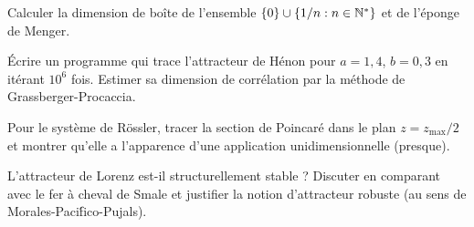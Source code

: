 \begin{exercice}
Calculer la dimension de bo\^ite de l'ensemble $\{0\} \cup \{1/n : n \in \mathbb{N}^*\}$
et de l'\'eponge de Menger.
\end{exercice}

\begin{exercice}
\'Ecrire un programme qui trace l'attracteur de H\'enon pour $a = 1{,}4$,
$b = 0{,}3$ en it\'erant $10^6$ fois. Estimer sa dimension de corr\'elation
par la m\'ethode de Grassberger-Procaccia.
\end{exercice}

\begin{exercice}
Pour le syst\`eme de R\"ossler, tracer la section de Poincar\'e dans le plan
$z = z_{\max}/2$ et montrer qu'elle a l'apparence d'une application
unidimensionnelle (presque).
\end{exercice}

\begin{exercice}
L'attracteur de Lorenz est-il structurellement stable ? Discuter en comparant
avec le fer \`a cheval de Smale et justifier la notion d'attracteur robuste
(au sens de Morales-Paci\'fico-Pujals).
\end{exercice}
